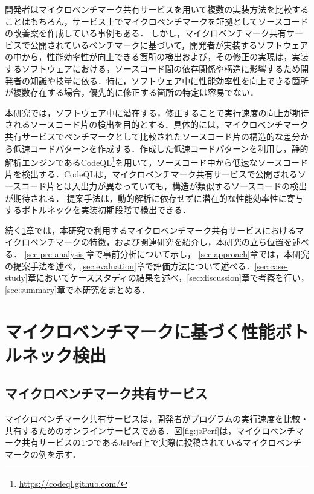 \documentclass[submit,techrep,noauthor]{ipsj}
\begin{document}
開発者はマイクロベンチマーク共有サービスを用いて複数の実装方法を比較することはもちろん，サービス上でマイクロベンチマークを証拠としてソースコードの改善案を作成している事例もある\cite{saiki}．
しかし，マイクロベンチマーク共有サービスで公開されているベンチマークに基づいて，開発者が実装するソフトウェアの中から，性能効率性が向上できる箇所の検出および，その修正の実現は，実装するソフトウェアにおける，ソースコード間の依存関係や構造に影響するため開発者の知識や技量に依る．特に，ソフトウェア中に性能効率性を向上できる箇所が複数存在する場合，優先的に修正する箇所の特定は容易でない．

本研究では，ソフトウェア中に潜在する，修正することで実行速度の向上が期待されるソースコード片の検出を目的とする．具体的には，マイクロベンチマーク共有サービスでベンチマークとして比較されたソースコード片の構造的な差分から低速コードパターンを作成する．作成した低速コードパターンを利用し，静的解析エンジンであるCodeQL\footnote{\url{https://codeql.github.com/}}\cite{ql}を用いて，ソースコード中から低速なソースコード片を検出する．CodeQLは，マイクロベンチマーク共有サービスで公開されるソースコード片とは入出力が異なっていても，構造が類似するソースコードの検出が期待される．
提案手法は，動的解析に依存せずに潜在的な性能効率性に寄与するボトルネックを実装初期段階で検出できる．

続く\ref{sec:background}章では，本研究で利用するマイクロベンチマーク共有サービスにおけるマイクロベンチマークの特徴，および関連研究を紹介し，本研究の立ち位置を述べる． \ref{sec:pre-analysis}章で事前分析について示し， \ref{sec:approach}章では，本研究の提案手法を述べ，\ref{sec:evaluation}章で評価方法について述べる．\ref{sec:case-study}章においてケーススタディの結果を述べ，\ref{sec:discussion}章で考察を行い，\ref{sec:summary}章で本研究をまとめる． 


\section{マイクロベンチマークに基づく性能ボトルネック検出}
\label{sec:background}

\subsection{マイクロベンチマーク共有サービス}


マイクロベンチマーク共有サービスは，開発者がプログラムの実行速度を比較・共有するためのオンラインサービスである．図\ref{fig:jsPerf}は，マイクロベンチマーク共有サービスの1つであるJsPerf上で実際に投稿されているマイクロベンチマークの例を示す．
\end{document}
